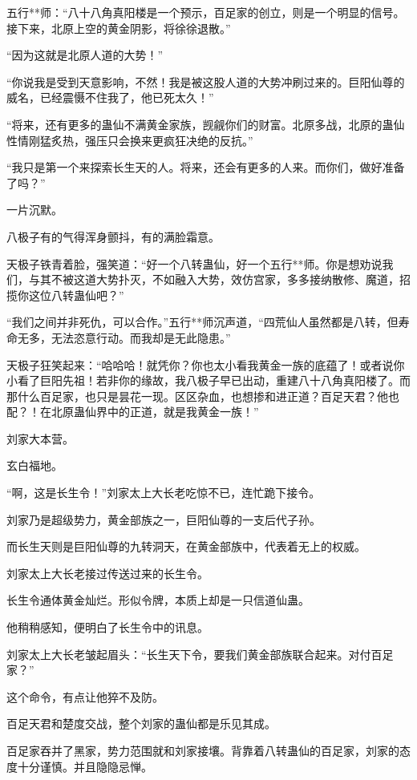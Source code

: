 
\begin{this_body}

五行**师：“八十八角真阳楼是一个预示，百足家的创立，则是一个明显的信号。接下来，北原上空的黄金阴影，将徐徐退散。”

“因为这就是北原人道的大势！”

“你说我是受到天意影响，不然！我是被这股人道的大势冲刷过来的。巨阳仙尊的威名，已经震慑不住我了，他已死太久！”

“将来，还有更多的蛊仙不满黄金家族，觊觎你们的财富。北原多战，北原的蛊仙性情刚猛炙热，强压只会换来更疯狂决绝的反抗。”

“我只是第一个来探索长生天的人。将来，还会有更多的人来。而你们，做好准备了吗？”

一片沉默。

八极子有的气得浑身颤抖，有的满脸霜意。

天极子铁青着脸，强笑道：“好一个八转蛊仙，好一个五行**师。你是想劝说我们，与其不被这道大势扑灭，不如融入大势，效仿宫家，多多接纳散修、魔道，招揽你这位八转蛊仙吧？”

“我们之间并非死仇，可以合作。”五行**师沉声道，“四荒仙人虽然都是八转，但寿命无多，无法恣意行动。而我却是无此隐患。”

天极子狂笑起来：“哈哈哈！就凭你？你也太小看我黄金一族的底蕴了！或者说你小看了巨阳先祖！若非你的缘故，我八极子早已出动，重建八十八角真阳楼了。而那什么百足家，也只是昙花一现。区区杂血，也想掺和进正道？百足天君？他也配？！在北原蛊仙界中的正道，就是我黄金一族！”

刘家大本营。

玄白福地。

“啊，这是长生令！”刘家太上大长老吃惊不已，连忙跪下接令。

刘家乃是超级势力，黄金部族之一，巨阳仙尊的一支后代子孙。

而长生天则是巨阳仙尊的九转洞天，在黄金部族中，代表着无上的权威。

刘家太上大长老接过传送过来的长生令。

长生令通体黄金灿烂。形似令牌，本质上却是一只信道仙蛊。

他稍稍感知，便明白了长生令中的讯息。

刘家太上大长老皱起眉头：“长生天下令，要我们黄金部族联合起来。对付百足家？”

这个命令，有点让他猝不及防。

百足天君和楚度交战，整个刘家的蛊仙都是乐见其成。

百足家吞并了黑家，势力范围就和刘家接壤。背靠着八转蛊仙的百足家，刘家的态度十分谨慎。并且隐隐忌惮。


\end{this_body}
